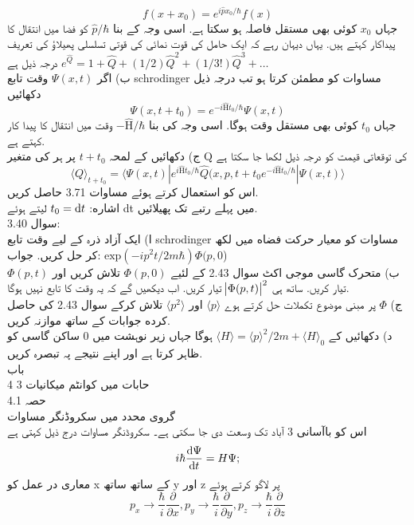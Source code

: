 \documentclass{book}
\begin{document}
\[f(x+x_{0})=e^{i\hat{p}x_{0}/\hbar}f(x)\]
جہاں
\(x_{0}\)
کوئی بھی مستقل فاصلہ ہو سکتا ہے. اسی وجہ کے بنا 
\(\hat{p}/\hbar\)
کو فضا میں  انتقال کا پیداکار کہتے ہیں. یہاں دیہان رہے کہ ایک حامل کی قوت نمائی کی قوتی تسلسلی پھیلاؤ کی تعریف درجہ ذیل ہے
\(e^{\hat{Q}}=1+\hat{Q}+(1/2)\hat{Q}^{2}+(1/3!)\hat{Q}^{3}+\dotsc\)\\
ب) اگر
\(\Psi(x,t)\)
وقت تابع schrodinger مساوات کو مطمئن کرتا ہو تب درجہ ذیل دکھائیں\\
\[\Psi(x,t+t_{0})=e^{-i\hat{\text{H}}t_{0}/\hbar}\Psi(x,t)\]
جہاں
\(t_{0}\)
کوئی بھی مستقل وقت ہوگا. اسی وجہ کی بنا
\(-\hat{\text{H}}/\hbar\)
وقت میں انتقال کا پیدا کار کہتے ہے.\\
ج) دکھائیں کے لمحہ
\(t+t_{0}\)
پر ہر کی متغير Q کی توقعاتی قیمت کو درجہ ذيل لکھا جا سکتا ہے\\
\[\langle Q \rangle _{t+t_{0}}=\langle \Psi(x,t)|e^{i\hat{\text{H}}t_{0}/\hbar}\hat{Q}(x,p,t+t_{0}e^{-i\hat{\text{H}}t_{0}/\hbar}|\Psi(x,t)\rangle\]
اس کو استعمال کرتے ہوئے مساوات 3.71 حاصل كریں.\\
اشاره:
 \(t_{0}=\dif{t}\) 
لیتے ہوئے dt میں پہلے رتبے تک پھیلائیں.\\
سوال 3.40:\\
ا) ایک آزاد ذرہ کے لیے وقت تابع schrodinger مساوات کو معیار حرکت فضاه میں لکھ کر حل کریں.
جواب:  
\(\text{exp}(-ip^{2}t/2m\hbar)\Phi(p,0\))\\
ب) متحرک گاسی موجی اکٹ سوال 2.43 کے لئیے
\(\Phi(p,0)\)
تلاش كريں اور
\(\Phi(p,t)\)
تیار كریں. ساتھ ہی
\(\abs{\Phi(p,t)}^{2}\)
تیار كريں. اب دیکھیں گے کہ یہ وقت کا تابع نہیں ہوگا.\\
ج)
\(\Phi\)
پر مبنی موضوع تكملات حل کرتے ہوے
\(\langle p \rangle\)
اور
\(\langle p^{2} \rangle\)
تلاش کرکے سوال 2.43 کی حاصل كرده جوابات کے ساتھ موازنہ كريں.\\
د) دکھائیں کے
\(\langle H \rangle =\langle p \rangle ^{2}/2m+\langle H \rangle _{0}\)
ہوگا جہاں زیر نوہشت میں 0 ساکن گاسی کو ظاہر کرتا ہے اور اپنے نتیجے پہ تبصرہ کریں.\\
باب \\4
3 حابات میں کوانٹم میکانیات \\
حصہ 4.1 \\
گروی محدد میں سکروڈنگر مساوات \\
اس کو باآسانی 3 آباد تک وسعت دی جا سکتی ہے۔
سکروڈنگر مساوات درج ذیل کہتی ہے \\
\[i\hbar\frac{\dif{\Psi}}{\dif{t}}=H\Psi;\]
معاری در عمل کو x کے ساتھ ساتھ y اور z پر لاگو کرتے ہوئے
\[p_{x}\rightarrow \frac{\hbar}{i}\frac{\partial}{\partial{x}},p_{y}\rightarrow \frac{\hbar}{i}\frac{\partial}{\partial{y}},p_{z}\rightarrow \frac{\hbar}{i}\frac{\partial}{\partial{z}}\]
\end{document}
